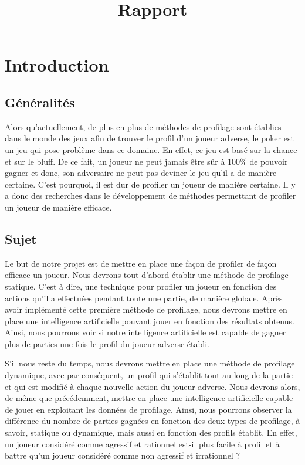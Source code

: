 \documentclass{report}
\title{Rapport}
\author{}
\date{}
\begin{document}
\maketitle

\newpage
\null %
\newpage

\tableofcontents %
\newpage

\chapter{Introduction}
\section{Généralités}
\hspace{0.5cm}Alors qu'actuellement, de plus en plus de méthodes de profilage sont établies dans le monde des jeux afin de trouver le profil d'un joueur adverse, le poker est un jeu qui pose problème dans ce domaine. En effet, ce jeu est basé sur la chance et sur le bluff. De ce fait, un joueur ne peut jamais être sûr à 100\% de pouvoir gagner et donc, son adversaire ne peut pas deviner le jeu qu'il a de manière certaine. C'est pourquoi, il est dur de profiler un joueur de manière certaine. Il y a donc des recherches dans le développement de méthodes permettant de profiler un joueur de manière efficace. \par

\section{Sujet}
\hspace{0.5cm}Le but de notre projet est de mettre en place une façon de profiler de façon efficace un joueur. Nous devrons tout d'abord établir une méthode de profilage statique. C'est à dire, une technique pour profiler un joueur en fonction des actions qu'il a effectuées pendant toute une partie, de manière globale. Après avoir implémenté cette première méthode de profilage, nous devrons mettre en place une intelligence artificielle pouvant jouer en fonction des résultats obtenus. Ainsi, nous pourrons voir si notre intelligence artificielle est capable de gagner plus de parties une fois le profil du joueur adverse établi.\par
S'il nous reste du temps, nous devrons mettre en place une méthode de profilage dynamique, avec par conséquent, un profil qui s’établit tout au long de la partie et qui est modifié à chaque nouvelle action du joueur adverse. Nous devrons alors, de même que précédemment, mettre en place une intelligence artificielle capable de jouer en exploitant les données de profilage. Ainsi, nous pourrons observer la différence du nombre de parties gagnées en fonction des deux types de profilage, à savoir, statique ou dynamique, mais aussi en fonction des profils établit. En effet, un joueur considéré comme agressif et rationnel est-il plus facile à profil et à battre qu'un joueur considéré comme non agressif et irrationnel ?\par
\end{document}
